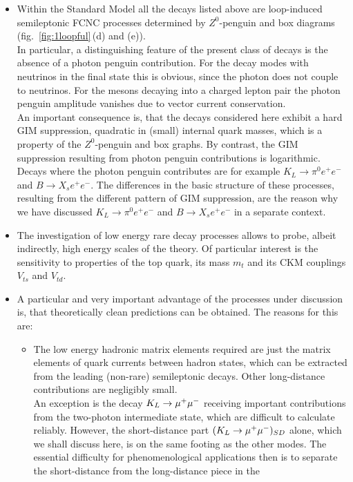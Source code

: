 \begin{itemize}
\item
Within the Standard Model all the decays listed above are loop-induced
semileptonic FCNC processes determined by $Z^0$-penguin and box diagrams
(fig.~\ref{fig:1loopful}\,(d) and (e)).\\
In particular, a distinguishing feature of the present class of decays
is the absence of a photon penguin contribution. For the decay modes
with neutrinos in the final state this is obvious, since the photon
does not couple to neutrinos. For the mesons decaying into a charged
lepton pair the photon penguin amplitude vanishes due to vector current
conservation.\\
An important consequence is, that the decays considered here exhibit a
hard GIM suppression, quadratic in (small) internal quark masses, which
is a property of the $Z^0$-penguin  and box graphs. By contrast, the
GIM suppression resulting from photon penguin contributions is
logarithmic. Decays where the photon penguin contributes are for
example $K_L\to\pi^0e^+e^-$ and $B \to X_s e^+ e^-$. The differences in
the basic structure of these processes, resulting from the different
pattern of GIM suppression, are the reason why we have discussed
$K_L\to\pi^0e^+e^-$ and $B \to X_s e^+ e^-$ in a separate context.
\item
The investigation of low energy rare decay processes allows to probe,
albeit indirectly, high energy scales of the theory. Of particular
interest is the sensitivity to properties of the top quark,
its mass $m_t$ and its CKM couplings $V_{ts}$ and $V_{td}$.
\item
A particular and very important advantage of the processes under
discussion is, that theoretically clean predictions can be obtained.
The reasons for this are:
\begin{itemize}
\item The low energy hadronic
matrix elements required are just the matrix elements of quark currents
between hadron states, which can be extracted from the leading
(non-rare) semileptonic decays. Other long-distance contributions
are negligibly small.\\
An exception is the decay $K_L \to \mu^+\mu^-$ receiving important contributions from
the two-photon intermediate state, which are difficult to calculate
reliably. However, the short-distance part $(K_L \to \mu^+\mu^-)_{SD}$ alone, which we
shall discuss here, is on the same footing as the other modes. The
essential difficulty for phenomenological applications then is to
separate the short-distance from the long-distance piece in the

\end{itemize}
\end{itemize}
